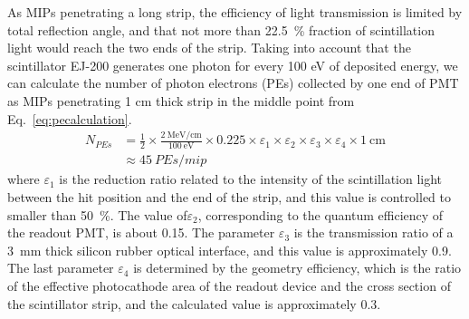 \documentclass[5p, times]{elsarticle}
\begin{document}
As MIPs penetrating a long strip, the efficiency of light transmission is limited by total reflection angle, and that not more than \SI{22.5}{\percent} fraction of scintillation light would reach the two ends of the strip. 
Taking into account that the scintillator EJ-200 generates one photon for every 100 eV of deposited energy, we can calculate the number of photon electrons (PEs) collected by one end of PMT as MIPs penetrating 1 cm thick strip in the middle point from Eq.~\ref{eq:pecalculation}.
\begin{align}
 N_{PEs} &= \frac{1}{2} \times \frac{\SI[per-mode=symbol]{2}{\mega\electronvolt\per\centi\meter}}{\SI{100}{\electronvolt}} \times 0.225
           \times \varepsilon_{1} \times \varepsilon_{2} \times \varepsilon_{3} \times \varepsilon_{4} \times \SI{1}{\centi\meter} \nonumber \\
         &\approx \SI{45}{PEs/mip}
\label{eq:pecalculation}
\end{align} 
where $\varepsilon_1$ is the reduction ratio related to the intensity of the scintillation light between the hit position and the end of the strip, and this value is controlled to smaller than \SI{50}{\percent}.
The value of$\varepsilon_2$, corresponding to the quantum efficiency of the readout PMT, is about 0.15. 
The parameter $\varepsilon_3$ is the transmission ratio of a \SI{3}{\milli\meter} thick silicon rubber optical interface, and this value is approximately 0.9. 
The last parameter $\varepsilon_4$ is determined by the geometry efficiency, which is the ratio of the effective photocathode area of the readout device and the cross section of the scintillator strip, and the calculated value is approximately 0.3.
\end{document}

